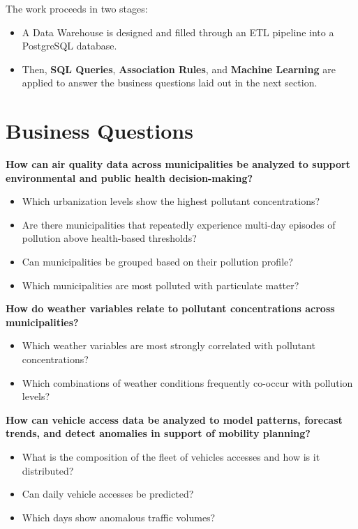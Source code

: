 \documentclass{article}
\begin{document}
	The work proceeds in two stages:
	\begin{itemize}
		\item A Data Warehouse is designed and filled through an ETL pipeline into a PostgreSQL database.
		\item Then, \textbf{SQL Queries}, \textbf{Association Rules}, and \textbf{Machine Learning} are applied to answer the business questions laid out in the next section.
	\end{itemize}
	
	\newpage
	\section{Business Questions}
	
	\textbf{How can air quality data across municipalities be analyzed to support environmental and public health decision-making?}
	\begin{itemize}
		\item Which urbanization levels show the highest pollutant concentrations?
		\item Are there municipalities that repeatedly experience multi-day episodes of pollution above health-based thresholds?
		\item Can municipalities be grouped based on their pollution profile?
		\item Which municipalities are most polluted with particulate matter?
	\end{itemize}

	\textbf{How do weather variables relate to pollutant concentrations across municipalities?}
	\begin{itemize}
		\item Which weather variables are most strongly correlated with pollutant concentrations?
		\item Which combinations of weather conditions frequently co-occur with pollution levels?
	\end{itemize}

	\textbf{How can vehicle access data be analyzed to model patterns, forecast trends, and detect anomalies in support of mobility planning?}
	\begin{itemize}
		\item What is the composition of the fleet of vehicles accesses and how is it distributed?
		\item Can daily vehicle accesses be predicted?
		\item Which days show anomalous traffic volumes?
	\end{itemize}
\end{document}

